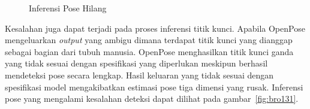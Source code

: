 \begin{figure}[htbp]
    \begin{center}
    \end{center}
    \vspace{-20pt}
    \captionsetup{labelfont=bf, textfont=bf}
    \caption{Inferensi Pose Hilang}
    \vspace{-10pt}
    \captionsetup{labelfont=md, textfont=md}
    \label{fig:bro76}
\end{figure}

\pagebreak

Kesalahan juga dapat terjadi pada proses inferensi titik kunci. Apabila OpenPose mengeluarkan
\textit{output} yang ambigu dimana terdapat titik kunci yang dianggap sebagai bagian dari tubuh manusia.
OpenPose menghasilkan titik kunci ganda yang tidak sesuai dengan spesifikasi yang diperlukan meskipun
berhasil mendeteksi pose secara lengkap.
Hasil keluaran yang tidak sesuai dengan spesifikasi model mengakibatkan estimasi pose tiga dimensi yang rusak.
Inferensi pose yang mengalami kesalahan deteksi dapat dilihat pada gambar~\ref{fig:bro131}.

